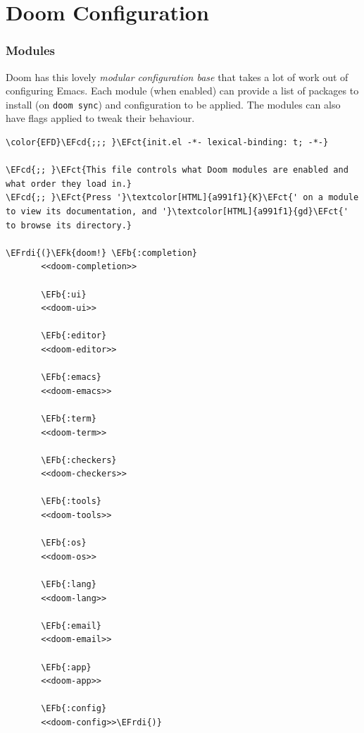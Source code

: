 \documentclass{scrartcl}
\newcommand{\EFk}[1]{\textcolor{EFk}{#1}} %
\newcommand{\EFb}[1]{\textcolor{EFb}{#1}} %
\newcommand{\EFct}[1]{\textcolor{EFct}{#1}} %
\newcommand{\EFcd}[1]{\textcolor{EFcd}{#1}} %
\newcommand{\EFrdi}[1]{#1} %
\begin{document}
\section{Doom Configuration}
\label{sec:org7bbebfb}
\subsubsection{Modules}
\label{sec:org0addaf1}
Doom has this lovely \emph{modular configuration base} that takes a lot of work out of
configuring Emacs. Each module (when enabled) can provide a list of packages to
install (on \texttt{doom sync}) and configuration to be applied. The modules can also
have flags applied to tweak their behaviour.

\begin{Code}
\begin{Verbatim}[]
\color{EFD}\EFcd{;;; }\EFct{init.el -*- lexical-binding: t; -*-}

\EFcd{;; }\EFct{This file controls what Doom modules are enabled and what order they load in.}
\EFcd{;; }\EFct{Press '}\textcolor[HTML]{a991f1}{K}\EFct{' on a module to view its documentation, and '}\textcolor[HTML]{a991f1}{gd}\EFct{' to browse its directory.}

\EFrdi{(}\EFk{doom!} \EFb{:completion}
       <<doom-completion>>

       \EFb{:ui}
       <<doom-ui>>

       \EFb{:editor}
       <<doom-editor>>

       \EFb{:emacs}
       <<doom-emacs>>

       \EFb{:term}
       <<doom-term>>

       \EFb{:checkers}
       <<doom-checkers>>

       \EFb{:tools}
       <<doom-tools>>

       \EFb{:os}
       <<doom-os>>

       \EFb{:lang}
       <<doom-lang>>

       \EFb{:email}
       <<doom-email>>

       \EFb{:app}
       <<doom-app>>

       \EFb{:config}
       <<doom-config>>\EFrdi{)}
\end{Verbatim}
\end{Code}
\end{document}
